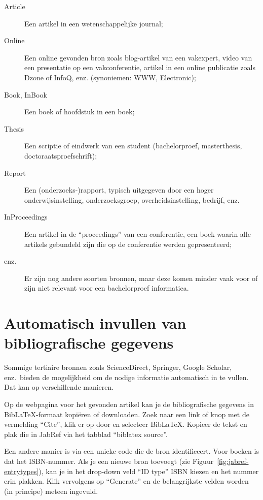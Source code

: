 \begin{description}
  \item[Article] Een artikel in een wetenschappelijke journal;
  \item[Online] Een online gevonden bron zoals blog-artikel van een vakexpert, video van een presentatie op een vakconferentie, artikel in een online publicatie zoals Dzone of InfoQ, enz. (synoniemen: WWW, Electronic);
  \item[Book, InBook] Een boek of hoofdstuk in een boek;
  \item[Thesis] Een scriptie of eindwerk van een student (bachelorproef, masterthesis, doctoraatsproefschrift);
  \item[Report] Een (onderzoeks-)rapport, typisch uitgegeven door een hoger onderwijsinstelling, onderzoeksgroep, overheidsinstelling, bedrijf, enz.
  \item[InProceedings] Een artikel in de ``proceedings'' van een conferentie, een boek waar\-in alle artikels gebundeld zijn die op de conferentie werden gepresenteerd;
  \item[enz.] Er zijn nog andere soorten bronnen, maar deze komen minder vaak voor of zijn niet relevant voor een bachelorproef informatica.
\end{description}

\section{Automatisch invullen van bibliografische gegevens}%
\label{sec:automatisch_invullen_van_bibliografische_gegevens}

Sommige tertiaire bronnen zoals ScienceDirect, Springer, Google Scholar, enz.\ bieden de mogelijkheid om de nodige informatie automatisch in te vullen. Dat kan op verschillende manieren.

Op de webpagina voor het gevonden artikel kan je de bibliografische gegevens in Bib{\LaTeX}-formaat kopiëren of downloaden. Zoek naar een link of knop met de vermelding ``Cite'', klik er op door en selecteer Bib{\LaTeX}. Kopieer de tekst en plak die in JabRef via het tabblad ``biblatex source''.

Een andere manier is via een unieke code die de bron identificeert. Voor boeken is dat het ISBN-nummer. Als je een nieuwe bron toevoegt (zie Figuur~\ref{fig:jabref-entrytypes}), kan je in het drop-down veld ``ID type'' ISBN kiezen en het nummer erin plakken. Klik vervolgens op ``Generate'' en de belangrijkste velden worden (in principe) meteen ingevuld.

